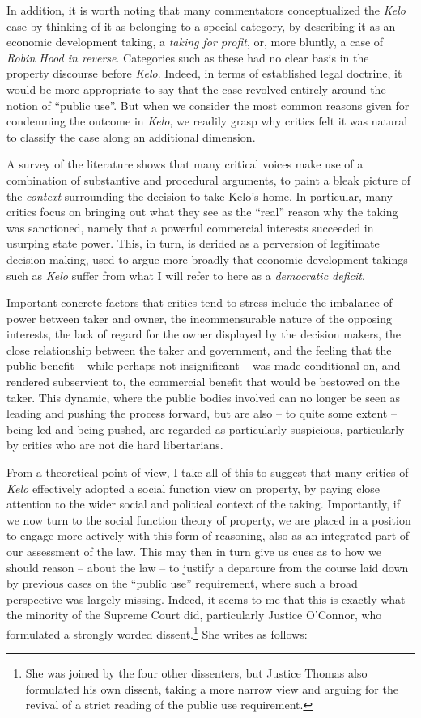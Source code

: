 In addition, it is worth noting that many commentators conceptualized the {\it Kelo} case by thinking of it as belonging to a special category, by describing it as an economic development taking, a {\it taking for profit}, or, more bluntly, a case of {\it Robin Hood in reverse}. Categories such as these had no clear basis in the property discourse before {\it Kelo}. Indeed, in terms of established legal doctrine, it would be more appropriate to say that the case revolved entirely around the notion of ``public use''. But when we consider the most common reasons given for condemning the outcome in {\it Kelo}, we readily grasp why critics felt it was natural to classify the case along an additional dimension. 

A survey of the literature shows that many critical voices make use of a combination of substantive and procedural arguments, to  paint a bleak picture of the {\it context} surrounding the decision to take Kelo's home. In particular, many critics focus on bringing out  what they see as the ``real'' reason why the taking was sanctioned, namely that a powerful commercial interests succeeded in usurping state power. This, in turn, is derided as a perversion of legitimate decision-making, used to argue more  broadly that economic development takings such as {\it Kelo} suffer from what I will refer to here as a {\it democratic deficit}. 

Important concrete factors that critics tend to stress include the imbalance of power between taker and owner, the incommensurable nature of the opposing interests, the lack of regard for the owner displayed by the decision makers, the close relationship between the taker and government, and the feeling that the public benefit -- while perhaps not insignificant -- was made conditional on, and rendered subservient to, the commercial benefit that would be bestowed on the taker. This dynamic, where the public bodies involved can no longer be seen as leading and pushing the process forward, but are also -- to quite some extent -- being led and being pushed, are regarded as particularly suspicious, particularly by critics who are not die hard libertarians.

From a theoretical point of view, I take all of this to suggest that many critics of {\it Kelo} effectively adopted a social function view on property, by paying close attention to the wider social and political context of the taking. Importantly, if we now turn to the social function theory of property, we are placed in a position to engage more actively with this form of reasoning, also as an integrated part of our assessment of the law. This may then in turn give us cues as to how we should reason -- about the law -- to justify a departure from the course laid down by previous cases on the ``public use'' requirement, where such a broad perspective was largely missing. Indeed, it seems to me that this is exactly what the minority of the Supreme Court did, particularly Justice O'Connor, who formulated a strongly worded dissent.\footnote{She was joined by the four other dissenters, but Justice Thomas also formulated his own dissent, taking a more narrow view and arguing for the revival of a strict reading of the public use requirement.}
She writes as follows:

